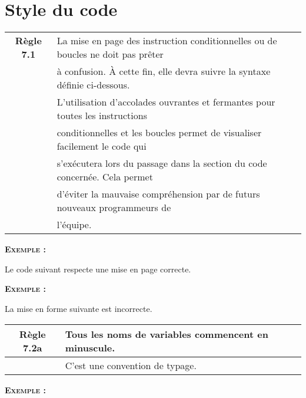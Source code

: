 \section{Style du code}

\begin{center}
\begin{tabular}{|c l|}
\hline
\rowcolor{red!10}\textbf{Règle 7.1} & La mise en page des instruction conditionnelles ou de boucles ne doit pas prêter\\
\rowcolor{red!10} & à confusion. À cette fin, elle devra suivre la syntaxe définie ci-dessous.\\ \hline
 & L’utilisation d’accolades ouvrantes et fermantes pour toutes les instructions \\
 & conditionnelles et les boucles permet de visualiser facilement le code qui \\
 & s’exécutera lors du passage dans la section du code concernée. Cela permet \\
 & d’éviter la mauvaise compréhension par de futurs nouveaux programmeurs de \\
 & l’équipe.\\ \hline
\hline
\end{tabular}
\end{center}

\smallskip
\begin{large}
\textbf{\textsc{Exemple :}}
\end{large}
Le code suivant respecte une mise en page correcte.
\smallskip


\smallskip
\begin{large}
\textbf{\textsc{Exemple :}}
\end{large}
La mise en forme suivante est incorrecte.
\smallskip


\medskip

\begin{center}
\begin{tabular}{|c l|}
\hline
\rowcolor{red!10}\textbf{Règle 7.2a} & Tous les noms de variables commencent en minuscule.\\ \hline
 & C’est une convention de typage.\\ \hline
\hline
\end{tabular}
\end{center}

\smallskip
\begin{large}
\textbf{\textsc{Exemple :}}
\end{large}



